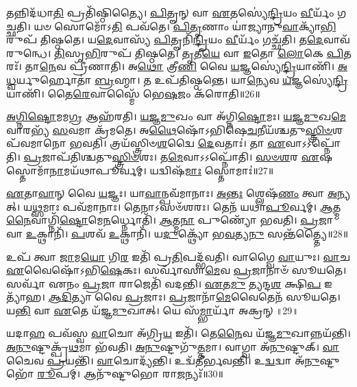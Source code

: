 𑌤𑌨𑍍𑌨𑌿𑌦᳴𑌧𑌾\-\ul{𑌤𑌿} 𑌪𑍍𑌰𑌤𑌿᳴\-𑌷𑍍𑌠𑌿𑌤𑍍𑌯𑍈।
\-\ul{𑌪𑌿}\-𑌤𑍄𑌨𑍍 𑌵𑌾 \ul{𑌏}\-𑌤𑌸𑍍𑌯𑍇॑\-\ul{𑌨𑍍𑌦𑍍𑌰𑌿}\-𑌯𑌂 \ul{𑌵𑍀}\-𑌰𑍍𑌯𑌂᳴ 𑌗𑌚𑍍𑌛𑌤𑌿।
𑌯𑍞 𑌸𑍋𑌮𑍋᳴𑌽\-\ul{𑌤𑌿} 𑌪𑌵᳴𑌤𑍇।
\-\ul{𑌪𑌿}\-\-\ul{𑌤𑍃}\-𑌣𑌾𑌂 𑌯𑌾॑𑌜𑍍𑌯𑌾𑌨𑍁\-\ul{𑌵𑌾}\-𑌕𑍍𑌯𑌾᳴\-\ul{𑌭𑌿}\-𑌰𑍁𑌪᳴ 𑌤𑌿𑌷𑍍𑌠𑌤𑍇।
𑌯\-\ul{𑌦𑍇}\-𑌵𑌾𑌸𑍍𑌯᳴ \ul{𑌪𑌿}\-𑌤𑍄𑌨𑌿᳴\-\ul{𑌨𑍍𑌦𑍍𑌰𑌿}\-𑌯𑌂 \ul{𑌵𑍀}\-𑌰𑍍𑌯𑌂᳴ 𑌗𑌚𑍍𑌛᳴𑌤𑌿।
𑌤\-\ul{𑌦𑍇}\-𑌵𑌾𑌵᳴ 𑌰𑍁𑌨𑍍𑌧𑍇।
\-\ul{𑌤𑌿}\-𑌸𑍃\-\ul{𑌭𑌿}\-𑌰𑍁𑌪᳴ 𑌤𑌿𑌷𑍍𑌠𑌤𑍇।
\-\ul{𑌤𑍃}\-𑌤𑍀\-\ul{𑌯𑍇} 𑌵𑌾 \ul{𑌇}\-𑌤𑍋 \ul{𑌲𑍋}\-𑌕𑍇 \ul{𑌪𑌿}\-𑌤𑌰𑌃᳴।
𑌤𑌾\-\ul{𑌨𑍇}\-𑌵 𑌪𑍍𑌰𑍀᳴𑌣𑌾𑌤𑌿।
𑌅\-\ul{𑌥𑍋} 𑌤𑍍𑌰𑍀\-\ul{𑌣𑌿} 𑌵𑍈 \ul{𑌯}\-𑌜𑍍𑌞𑌸𑍍𑌯𑍇॑\-\ul{𑌨𑍍𑌦𑍍𑌰𑌿}\-𑌯𑌾𑌣𑌿᳴।
\-\ul{𑌅}\-\-\ul{𑌧𑍍𑌵}\-𑌰𑍍𑌯𑍁𑌰𑍍\mbox{}𑌹𑍋𑌤𑌾॑ \ul{𑌬𑍍𑌰}\-𑌹𑍍𑌮𑌾।
𑌤 𑌉𑌪᳴𑌤𑌿𑌷𑍍𑌠𑌨𑍍𑌤𑍇।
𑌯𑌾\-\ul{𑌨𑍍𑌯𑍇}\-𑌵 \ul{𑌯}\-𑌜𑍍𑌞𑌸𑍍𑌯𑍇॑\-\ul{𑌨𑍍𑌦𑍍𑌰𑌿}\-𑌯𑌾𑌣𑌿᳴।
𑌤𑍈\-\ul{𑌰𑍇}\-𑌵𑌾𑌸𑍍𑌮𑍈᳴ 𑌭𑍇\-\ul{𑌷}\-𑌜𑌂 𑌕᳴𑌰𑍋𑌤𑌿॥26॥\anuvakamend[\-\ul{𑌪𑍍𑌰𑍀}\-\-\ul{𑌣𑌾}\-\-\ul{𑌤𑌿} \ul{𑌪𑍍𑌰}\-\-\ul{𑌥}\-𑌮𑍋 𑌦𑌕𑍍𑌷𑌿᳴𑌣𑌾 \ul{𑌸}\-𑌮𑌵᳴𑌨𑌯𑌤𑌿 \ul{𑌧𑌾}\-𑌰𑌯᳴𑌤𑍀\-\ul{𑌨𑍍𑌦𑍍𑌰𑌿}\-𑌯𑌾𑌣𑌿᳴ \ul{𑌚}\-𑌤𑍍𑌵𑌾𑌰𑌿᳴ 𑌚]

\-\ul{𑌅}\-\-\ul{𑌗𑍍𑌨𑌿}\-\-\ul{𑌷𑍍𑌟𑍋}\-𑌮𑌮\-\ul{𑌗𑍍𑌰} 𑌆𑌹᳴𑌰𑌤𑌿।
\-\ul{𑌯}\-\-\ul{𑌜𑍍𑌞}\-\-\ul{𑌮𑍁}\-𑌖𑌂 𑌵𑌾 𑌅᳴𑌗𑍍𑌨𑌿\-\ul{𑌷𑍍𑌟𑍋}\-𑌮𑌃।
\-\ul{𑌯}\-\-\ul{𑌜𑍍𑌞}\-\-\ul{𑌮𑍁}\-𑌖\-\ul{𑌮𑍇}\-𑌵𑌾𑌰𑌭𑍍𑌯᳴ \ul{𑌸}\-𑌵𑌮𑌾 𑌕𑍍𑌰᳴𑌮𑌤𑍇।
𑌅\-\ul{𑌥𑍈}\-𑌷𑍋᳴\-𑌽𑌭𑌿𑌷𑍇\-\ul{𑌚}\-𑌨𑍀𑌯᳴𑌶𑍍𑌚𑌤𑍁\-\-\ul{𑌸𑍍𑌤𑍍𑌰𑌿}\-\-\ul{𑍞}\-𑌶𑌪᳴𑌵𑌮𑌾𑌨𑍋 𑌭𑌵𑌤𑌿।
𑌤𑍍𑌰𑌯᳴𑌸𑍍𑌤𑍍𑌰𑌿𑍞\-\ul{𑌶}\-𑌦𑍍𑌵𑍈 \ul{𑌦𑍇}\-𑌵𑌤𑌾𑌃॑।
𑌤𑌾 \ul{𑌏}\-𑌵𑌾𑌽𑌽𑌪𑍍𑌨𑍋᳴𑌤𑌿।
\-\ul{𑌪𑍍𑌰}\-𑌜𑌾𑌪᳴𑌤𑌿𑌶𑍍𑌚𑌤𑍁\-\ul{𑌸𑍍𑌤𑍍𑌰𑌿}\-\-\ul{𑍞}\-𑌶𑌃।
𑌤\-\ul{𑌮𑍇}\-𑌵𑌾𑌽𑌽𑌪𑍍𑌨𑍋᳴𑌤𑌿।
\-\ul{𑌸}\-\-\ul{𑍞}\-\-\ul{𑌶}\-𑌰 \ul{𑌏}\-𑌷 𑌸𑍍𑌤𑍋𑌮𑌾᳴\-\ul{𑌨𑌾}\-𑌮𑌯᳴𑌥𑌾\-𑌪𑍂𑌰𑍍𑌵𑌮𑍍।
𑌯𑌦𑍍𑌵𑌿𑌷᳴\-\ul{𑌮𑌾𑌃} 𑌸𑍍𑌤𑍋𑌮𑌾𑌃॑॥27॥

\-\ul{𑌏}\-𑌤𑌾\-\ul{𑌵𑌾}\-𑌨𑍍 𑌵𑍈 \ul{𑌯}\-𑌜𑍍𑌞𑌃।
𑌯𑌾\-\ul{𑌵𑌾}\-𑌨𑍍𑌪𑌵᳴𑌮𑌾𑌨𑌾𑌃।
\-\ul{𑌅}\-\-\ul{𑌨𑍍𑌤𑌃} 𑌶𑍍𑌲𑍇𑌷᳴\-\ul{𑌣𑌂} 𑌤𑍍𑌵𑌾 \ul{𑌅}\-𑌨𑍍𑌯𑌤𑍍।
𑌯\-\ul{𑌥𑍍𑌸}\-𑌮𑌾𑌃 𑌪𑌵᳴𑌮𑌾𑌨𑌾𑌃।
𑌤𑍇𑌨𑌾𑌽𑌸𑍞᳴𑌶𑌰𑌃।
𑌤𑍇𑌨᳴ 𑌯𑌥𑌾\-\ul{𑌪𑍂}\-𑌰𑍍𑌵𑌮𑍍।
\-\ul{𑌆}\-𑌤𑍍𑌮\-\ul{𑌨𑍈}\-𑌵𑌾𑌗𑍍𑌨𑌿᳴\-\ul{𑌷𑍍𑌟𑍋}\-𑌮𑍇\-\ul{𑌨}\-𑌰𑍍𑌧𑍍𑌨𑍋𑌤𑌿᳴।
\-\ul{𑌆}\-𑌤𑍍𑌮\-\ul{𑌨𑌾} 𑌪𑍁𑌣𑍍𑌯𑍋᳴ 𑌭𑌵𑌤𑌿।
\-\ul{𑌪𑍍𑌰}\-𑌜𑌾 𑌵𑌾 \ul{𑌉}\-𑌕𑍍𑌥𑌾𑌨𑌿᳴।
\-\ul{𑌪}\-𑌶𑌵᳴ \ul{𑌉}\-𑌕𑍍𑌥𑌾𑌨𑌿᳴।
𑌯\-\ul{𑌦𑍁}\-𑌕𑍍𑌥𑍍𑌯𑍋᳴ 𑌭\-\ul{𑌵}\-𑌤𑍍𑌯\-\ul{𑌨𑍁} 𑌸𑌨𑍍𑌤᳴𑌤𑍍𑌤𑍍𑌯𑍈॥28॥\anuvakamend[𑌸𑍍𑌤𑍋𑌮𑌾॑: \ul{𑌪}\-𑌶𑌵᳴ \ul{𑌉}\-𑌕𑍍𑌥𑌾𑌨𑍍𑌯𑍇𑌕𑌂᳴ 𑌚]

𑌉𑌪᳴ 𑌤𑍍𑌵𑌾 \ul{𑌜𑌾}\-𑌮\-\ul{𑌯𑍋} 𑌗𑌿\-\ul{𑌰} 𑌇𑌤𑌿᳴ 𑌪𑍍𑌰\-\ul{𑌤𑌿}\-𑌪𑌦𑍍𑌭᳴𑌵𑌤𑌿।
𑌵𑌾𑌗𑍍𑌵𑍈 \ul{𑌵𑌾}\-𑌯𑍁𑌃।
\-\ul{𑌵𑌾}\-𑌚 \ul{𑌏}\-𑌵𑍈𑌷𑍋᳴\-𑌽𑌭𑌿\-\ul{𑌷𑍇}\-𑌕𑌃।
𑌸𑌰𑍍𑌵𑌾᳴𑌸𑌾\-\ul{𑌮𑍇}\-𑌵 \ul{𑌪𑍍𑌰}\-𑌜𑌾𑌨𑌾𑍞᳴ 𑌸𑍂𑌯𑌤𑍇।
𑌸𑌰𑍍𑌵𑌾᳴ 𑌏𑌨𑌂 \ul{𑌪𑍍𑌰}\-𑌜𑌾 𑌰𑌾𑌜𑍇𑌤𑌿᳴ 𑌵𑌦𑌨𑍍𑌤𑌿।
\-\ul{𑌏}\-𑌤\-\ul{𑌮𑍁} 𑌤𑍍𑌯𑌨𑍍𑌦\-\ul{𑌶} 𑌕𑍍𑌷𑌿\-\ul{𑌪} 𑌇𑌤𑍍𑌯𑌾᳴𑌹।
\-\ul{𑌆}\-\-\ul{𑌦𑌿}\-𑌤𑍍𑌯𑌾 𑌵𑍈 \ul{𑌪𑍍𑌰}\-𑌜𑌾𑌃।
\-\ul{𑌪𑍍𑌰}\-𑌜𑌾𑌨𑌾᳴\-\ul{𑌮𑍇}\-𑌵𑍈𑌤𑍇𑌨᳴ 𑌸𑍂𑌯𑌤𑍇।
𑌯\-\ul{𑌨𑍍𑌤𑌿} 𑌵𑌾 \ul{𑌏}\-𑌤𑍇 𑌯᳴𑌜𑍍𑌞\-\ul{𑌮𑍁}\-𑌖𑌾𑌤𑍍।
𑌯𑍇 𑌸᳴\-\ul{𑌮𑍍𑌭𑌾}\-𑌰𑍍𑌯𑌾᳴ 𑌅𑌕𑍍𑌰𑌨𑍍॥29॥

𑌯𑌦𑌾\-\ul{𑌹} 𑌪𑌵᳴𑌸𑍍𑌵 \ul{𑌵𑌾}\-𑌚𑍋 𑌅᳴𑌗𑍍𑌰𑌿\-\ul{𑌯} 𑌇𑌤𑌿᳴।
𑌤𑍇\-\ul{𑌨𑍈}\-𑌵 𑌯᳴𑌜𑍍𑌞\-\ul{𑌮𑍁}\-𑌖𑌾𑌨𑍍𑌨𑌯᳴𑌨𑍍𑌤𑌿।
\-\ul{𑌅}\-\-\ul{𑌨𑍁}\-𑌷𑍍𑌟𑍁𑌕𑍍𑌪𑍍𑌰᳴\-\ul{𑌥}\-𑌮𑌾 𑌭᳴𑌵𑌤𑌿।
\-\ul{𑌅}\-\-\ul{𑌨𑍁}\-𑌷𑍍𑌟𑍁𑌗𑍁᳴\-\ul{𑌤𑍍𑌤}\-𑌮𑌾।
𑌵𑌾𑌗𑍍𑌵𑌾 𑌅᳴\-\ul{𑌨𑍁}\-𑌷𑍍𑌟𑍁𑌕𑍍।
\-\ul{𑌵𑌾}\-𑌚𑍈𑌵 \ul{𑌪𑍍𑌰}\-𑌯𑌨𑍍𑌤𑌿᳴।
\-\ul{𑌵𑌾}\-𑌚𑍋𑌦𑍍𑌯᳴𑌨𑍍𑌤𑌿।
𑌉𑌦𑍍𑌵᳴𑌤𑍀𑌰𑍍𑌭𑌵𑌨𑍍𑌤𑌿।
𑌉\-\ul{𑌦𑍍𑌵}\-𑌦𑍍𑌵𑌾 𑌅᳴\-\ul{𑌨𑍁}\-𑌷𑍍𑌟𑍁𑌭𑍋᳴ \ul{𑌰𑍂}\-𑌪𑌮𑍍।
𑌆𑌨𑍁᳴𑌷𑍍𑌟𑍁𑌭𑍋 𑌰𑌾\-\ul{𑌜}\-𑌨𑍍𑌯𑌃᳴॥30॥

